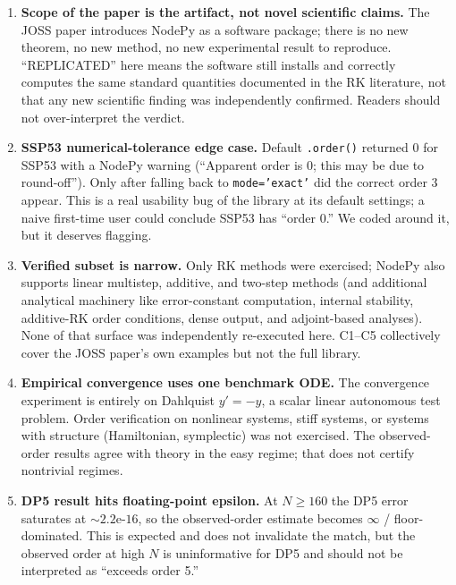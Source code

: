 \documentclass[11pt]{article}
\begin{document}
\begin{enumerate}

\item \textbf{Scope of the paper is the artifact, not novel scientific
claims.} The JOSS paper introduces NodePy as a software package; there is
no new theorem, no new method, no new experimental result to reproduce.
``REPLICATED'' here means the software still installs and correctly
computes the same standard quantities documented in the RK literature,
not that any new scientific finding was independently confirmed. Readers
should not over-interpret the verdict.

\item \textbf{SSP53 numerical-tolerance edge case.} Default
\texttt{.order()} returned 0 for SSP53 with a NodePy warning
(``Apparent order is 0; this may be due to round-off''). Only after
falling back to \texttt{mode='exact'} did the correct order 3 appear.
This is a real usability bug of the library at its default settings; a
naive first-time user could conclude SSP53 has ``order 0.'' We coded
around it, but it deserves flagging.

\item \textbf{Verified subset is narrow.} Only RK methods were exercised;
NodePy also supports linear multistep, additive, and two-step methods
(and additional analytical machinery like error-constant computation,
internal stability, additive-RK order conditions, dense output, and
adjoint-based analyses). None of that surface was independently
re-executed here. C1--C5 collectively cover the JOSS paper's own examples
but not the full library.

\item \textbf{Empirical convergence uses one benchmark ODE.} The
convergence experiment is entirely on Dahlquist $y' = -y$, a scalar
linear autonomous test problem. Order verification on nonlinear systems,
stiff systems, or systems with structure (Hamiltonian, symplectic) was
not exercised. The observed-order results agree with theory in the easy
regime; that does not certify nontrivial regimes.

\item \textbf{DP5 result hits floating-point epsilon.} At $N \ge 160$ the
DP5 error saturates at $\sim 2.2\text{e-}16$, so the observed-order
estimate becomes $\infty$ / floor-dominated. This is expected and does
not invalidate the match, but the observed order at high $N$ is
uninformative for DP5 and should not be interpreted as ``exceeds order
5.''


\end{enumerate}
\end{document}
